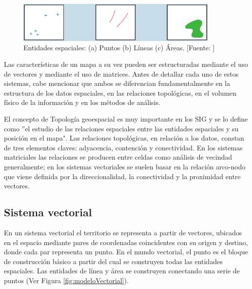 \begin{figure}[H]
    \centering
    \includegraphics[width=10cm]{entidadesGeometricas.png}
    \caption{Entidades espaciales: (a) Puntos (b) Líneas (c) Áreas. [Fuente: ]}
    \label{fig:entidadesPuntoLineaPoligono}
\end{figure}

Las características de un mapa a su vez pueden ser estructuradas mediante el uso de vectores y mediante el uso de matrices. Antes de detallar cada uno de estos sistemas, cabe mencionar que ambos se diferencian fundamentalmente en la estructura de los datos espaciales, en las relaciones topológicas, en el volumen físico de la información y en los métodos de análisis.

El concepto de Topología geoespacial es muy importante en los SIG y se lo define como ''el estudio de las relaciones espaciales entre las entidades espaciales y su posición en el mapa". Las relaciones topológicas, en relación a los datos, constan de tres elementos claves: adyacencia, contención y conectividad. En los sistemas matriciales las relaciones se producen entre celdas como análisis de vecindad generalmente; en los sistemas vectoriales se suelen basar en la relación arco-nodo que viene definida por la direccionalidad, la conectividad y la proximidad entre vectores.

\subsection{Sistema vectorial}

En un sistema vectorial el territorio se representa a partir de vectores, ubicados en el espacio mediante pares de coordenadas coincidentes con su origen y destino, donde cada par representa un punto. En el mundo vectorial, el punto es el bloque de construcción básico a partir del cual se construyen todas las entidades espaciales. Las entidades de línea y área se construyen conectando una serie de puntos (Ver Figura \ref{fig:modeloVectorial}).

